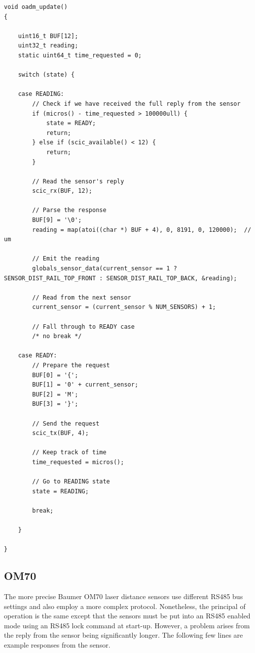 \begin{verbatim}
void oadm_update()
{

    uint16_t BUF[12];
    uint32_t reading;
    static uint64_t time_requested = 0;

    switch (state) {

    case READING:
        // Check if we have received the full reply from the sensor
        if (micros() - time_requested > 100000ull) {
            state = READY;
            return;
        } else if (scic_available() < 12) {
            return;
        }

        // Read the sensor's reply
        scic_rx(BUF, 12);

        // Parse the response
        BUF[9] = '\0';
        reading = map(atoi((char *) BUF + 4), 0, 8191, 0, 120000);  // um

        // Emit the reading
        globals_sensor_data(current_sensor == 1 ? SENSOR_DIST_RAIL_TOP_FRONT : SENSOR_DIST_RAIL_TOP_BACK, &reading);

        // Read from the next sensor
        current_sensor = (current_sensor % NUM_SENSORS) + 1;

        // Fall through to READY case
        /* no break */

    case READY:
        // Prepare the request
        BUF[0] = '{';
        BUF[1] = '0' + current_sensor;
        BUF[2] = 'M';
        BUF[3] = '}';

        // Send the request
        scic_tx(BUF, 4);

        // Keep track of time
        time_requested = micros();

        // Go to READING state
        state = READING;

        break;

    }

}
\end{verbatim}

\subsection{OM70}

The more precise Baumer OM70 laser distance sensors\cite{om70} use different RS485 bus settings and also employ a more complex protocol. Nonetheless, the principal of operation is the same except that the sensors must be put into an RS485 enabled mode using an RS485 lock command at start-up. However, a problem arises from the reply from the sensor being significantly longer. The following few lines are example responses from the sensor.

